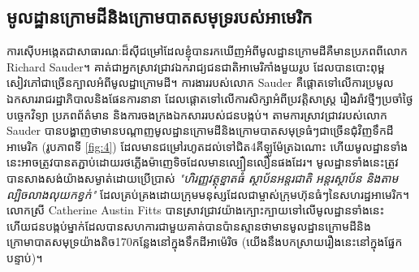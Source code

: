 \documentclass[10pt,twocolumn,letterpaper]{article}
\begin{document}
\subsection{មូលដ្ឋានក្រោមដីនិងក្រោមបាតសមុទ្ររបស់អាមេរិក}

	ការស៊ើបអង្កេតជាសាធារណៈដ៏សុីជម្រៅដែលខ្ញុំបានរកឃើញអំពីមូលដ្ឋានក្រោមដីគឺមានប្រភពពីលោក Richard Sauder។ គាត់ជាអ្នកស្រាវជ្រាវឯករាជ្យជនជាតិអាមេរិកាំងមួយរូប ដែលបានបោះពុម្ពសៀវភៅជាច្រើនក្បាលអំពីមូលដ្ឋាក្រោមដី\cite{22}។ ការងាររបស់លោក Sauder គឺផ្តោតទៅលើការប្រមូលឯកសាររាជរដ្ឋាភិបាលនិងផែនការនានា ដែលផ្តោតទៅលើការសិក្សាអំពីប្រវត្តិសាស្ត្រ រឿងរ៉ាវថ្មីៗប្រចាំថ្ងៃ បច្ចេកវិទ្យា ប្រភពព័ត៌មាន និងការចងក្រងឯកសាររបស់ជនបង្កប់។ តាមការស្រាវជ្រាវរបស់លោក Sauder បានបង្ហាញថាមានបណ្តាញមូលដ្ឋានក្រោមដីនិងក្រោមបាតសមុទ្រធំៗជាច្រើនជុំវិញទឹកដីអាមេរិក (រូបភាពទី \ref{fig:4}) ដែលមានជម្រៅរហូតដល់ទៅជិត4គីឡូម៉ែត្រឯណោះ ហើយមូលដ្ឋានទាំងនេះអាចត្រូវបានតភ្ជាប់ដោយរថភ្លើងម៉ាញេទិចដែលមានល្បឿនលឿនផងដែរ។ មូលដ្ឋានទាំងនេះ​ត្រូវបានសាងសង់យ៉ាងសម្ងាត់ដោយប្រើប្រាស់ \textit{"ហិរញ្ញវត្ថុខ្នាតធំ​ ស្ថាប័នអន្តរជាតិ អន្តរស្ថាប័ន និងតាមល្បិចលាងលុយកខ្វក់"} ដែលគ្រប់គ្រងដោយក្រុមមនុស្សដែលជាម្ចាស់ក្រុមហ៊ុនធំៗនៃសហរដ្ឋអាមេរិក\cite{22}។ លោកស្រី Catherine Austin Fitts បានស្រាវជ្រាវយ៉ាងក្បោះក្បាយទៅលើមូលដ្ឋានទាំងនេះ ហើយជនបង្កប់ម្នាក់ដែលបានសហការជាមួយគាត់បានប៉ានស្មានថាមានមូលដ្ឋានក្រោមដីនិងក្រោមាបាតសមុទ្រយ៉ាងតិច170កន្លែងនៅក្នុងទឹកដីអាម៉េរិច (យើងនឹងបកស្រាយរឿងនេះនៅក្នុងផ្នែកបន្ទាប់)\cite{16,20}។
\end{document}
